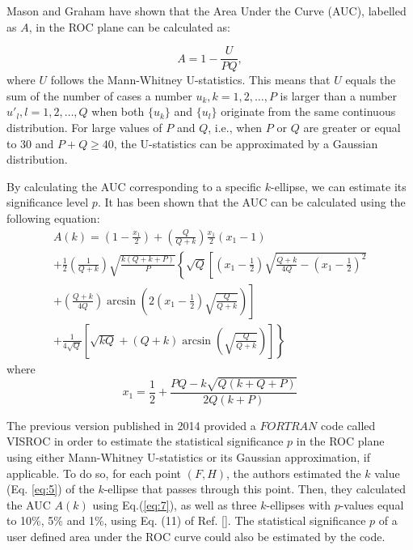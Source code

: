 \documentclass[preprint,12pt]{elsarticle}
\begin{document}
Mason and Graham\cite{MAS02} have shown that the Area Under the Curve (AUC), labelled as $A$, in the ROC plane can be calculated as:

\begin{equation}\label{eq:6}
A=1-\frac{U}{PQ},
\end{equation}
where $U$ follows the Mann-Whitney U-statistics\cite{MAN47}. This means that $U$  equals the sum of the number of cases a number $u_k, k=1, 2, \dots, P$ 
is larger than a number $u'_l, l=1, 2, \dots, Q$ when both $\{u_k\}$ and $\{u_l\}$ originate from the same continuous distribution. For large values of $P$ and $Q$, i.e., when $P$ or $Q$ are greater or equal to 30 and $P+Q\geq 40$, the U-statistics can be approximated\cite{MAS02} by a Gaussian distribution.

By calculating the AUC corresponding to a specific $k$-ellipse, we can estimate its significance level $p$. It has been shown\cite{visroc1} that the AUC can be calculated using the following equation: 
\begin{eqnarray}\label{eq:7}
A(k)= \left(1-\frac{x_1}{2}\right)   +  
\left(\frac{Q}{Q+k}\right)\frac{x_1}{2}\left(x_1-1\right) 
\phantom{aaaaaaaaa}\nonumber \\
+ \frac{1}{2}\left(\frac{1}{Q+k}\right)\sqrt{\frac{k\left(Q+k+P\right)}{P}}
\left\{   \sqrt{Q}  \left[
\left(x_1-\frac{1}{2}\right)\sqrt{\frac{Q+k}{4Q}  - 
\left(x_1-\frac{1}{2}\right)^2} \right. \right. \nonumber \\ \left. \left. 
+\left(\frac{Q+k}{4Q}\right)   \arcsin   \left(2\left(x_1-\frac{1}{2}
\right)\sqrt{\frac{Q}{Q+k}}\right)\right] \right. \phantom{aaaaaaaaaaaaaa}
\nonumber  \\ \left. 
+\frac{1}{4\sqrt{Q}}\left[  \sqrt{kQ} 
+(Q+k)\arcsin \left( \sqrt{\frac{Q}{Q+k}}\right)\right] \right\}
\phantom{aaaaaaaaaaaai}
\end{eqnarray}
where\begin{equation}\label{eq:8}
x_1=\frac{1}{2}+\frac{PQ-k\sqrt{Q(k+Q+P)}}{2Q(k+P)}
\end{equation}

The previous version\cite{visroc1} published in 2014 provided a $FORTRAN$ code called VISROC in order to estimate the statistical significance $p$ in the ROC plane using either Mann-Whitney U-statistics or its Gaussian approximation, if applicable. To do so, for each point $(F,H)$, the authors estimated the $k$ value (Eq. \ref{eq:5}) of the $k$-ellipse that passes through this point. Then, they calculated the AUC $A(k)$ using Eq.(\ref{eq:7}), as well as three $k$-ellipses with $p$-values equal to 10\%, 5\% and 1\%, using Eq. (11) of Ref. []. The statistical significance $p$ of a user defined area under the ROC curve could also be estimated by the code.
\end{document}
